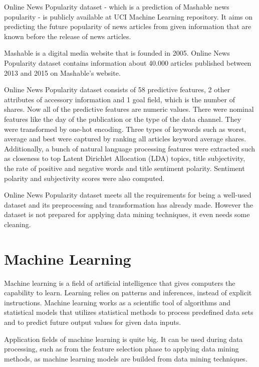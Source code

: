 Online News Popularity dataset \cite{Fernandes2015API} - which is a prediction of Mashable news popularity - is publicly available at UCI Machine Learning repository. It aims on predicting the future popularity of news articles from given information that are known before the release of news articles. \smallskip

Mashable is a digital media website that is founded in 2005. Online News Popularity dataset \cite{inproceedings} contains information about 40.000 articles published between 2013 and 2015 on Mashable's website. \smallskip

Online News Popularity dataset consists of 58 predictive features, 2 other attributes of accessory information and 1 goal field, which is the number of shares. Now all of the predictive features are numeric values. There were nominal features like the day of the publication or the type of the data channel. They were transformed by one-hot encoding. Three types of keywords such as worst, average and best were captured by ranking all articles keyword average shares. Additionally, a bunch of natural language processing features were extracted such as closeness to top Latent Dirichlet Allocation (LDA) topics, title subjectivity, the rate of positive and negative words and title sentiment polarity. Sentiment polarity and subjectivity scores were also computed.\smallskip

Online News Popularity dataset meets all the requirements for being a well-used dataset and its preprocessing and transformation has already made. However the dataset is not prepared for applying data mining techniques, it even needs some cleaning.



\section{Machine Learning}

Machine learning is a field of artificial intelligence that gives computers the capability to learn. Learning relies on patterns and inferences, instead of explicit instructions. Machine learning works as a scientific tool of algorithms and statistical models that utilizes statistical methods to process predefined data sets and to predict future output values for given data inputs. \medskip

Application fields of machine learning is quite big. It can be used during data processing, such as from the feature selection phase to applying data mining methods, as machine learning models are builded from data mining techniques. 

